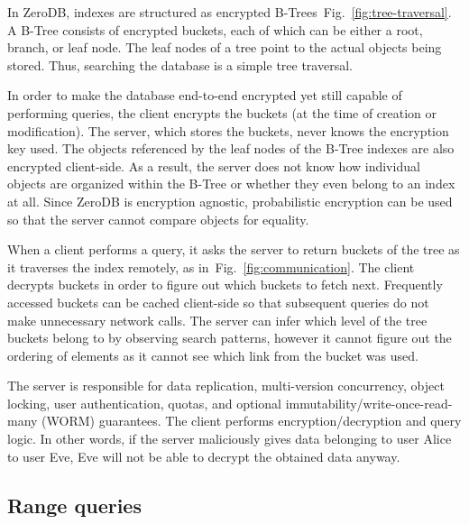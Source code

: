 \documentclass[notitlepage,longbibliography]{revtex4-1}
\newcommand{\figref}[1]{Fig.~\ref{#1}}
\begin{document}
In ZeroDB, indexes are structured as encrypted B-Trees~\figref{fig:tree-traversal}.
A B-Tree consists of encrypted buckets, each of which can be either a root, branch, or leaf node.
The leaf nodes of a tree point to the actual objects being stored.
Thus, searching the database is a simple tree traversal.

In order to make the database end-to-end encrypted yet still capable of performing queries, the client encrypts the buckets (at the time of creation or modification).
The server, which stores the buckets, never knows the encryption key used.
The objects referenced by the leaf nodes of the B-Tree indexes are also encrypted client-side.
As a result, the server does not know how individual objects are organized within the B-Tree or whether they even belong to an index at all.
Since ZeroDB is encryption agnostic, probabilistic encryption can be used so that the server cannot compare objects for equality.

When a client performs a query, it asks the server to return buckets of the tree as it traverses the index remotely, as in~\figref{fig:communication}.
The client decrypts buckets in order to figure out which buckets to fetch next.
Frequently accessed buckets can be cached client-side so that subsequent queries do not make unnecessary network calls.
The server can infer which level of the tree buckets belong to by observing search patterns,
however it cannot figure out the ordering of elements as it cannot see which link from the bucket was used.

The server is responsible for data replication, multi-version concurrency, object locking, user authentication, quotas, and optional immutability/write-once-read-many (WORM) guarantees.
The client performs encryption/decryption and query logic.
In other words, if the server maliciously gives data belonging to user Alice to user Eve,
Eve will not be able to decrypt the obtained data anyway.

\subsection{Range queries}
\end{document}
